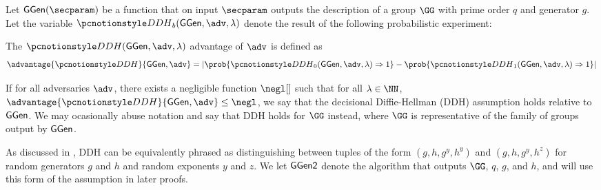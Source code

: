 Let $\groupgen(\secparam)$ be a function that on input $\secparam$ outputs the description of a group $\GG$ with prime order $q$ and generator $g$.
Let the variable $\ddh_b(\groupgen, \adv, \secpar)$ denote the result of the following probabilistic experiment:


The $\ddh(\groupgen, \adv, \secpar)$ advantage of $\adv$ is defined as
$$
	\advantage{\ddh}{\groupgen, \adv} = \left|\prob{\ddh_0(\groupgen, \adv, \secpar) \Rightarrow 1} - \prob{\ddh_1(\groupgen, \adv, \secpar) \Rightarrow 1}\right|
$$

If for all adversaries $\adv$, there exists a negligible function $\negl[]$ such that for all $\secpar \in \NN$, $\advantage{\ddh}{\groupgen, \adv} \allowbreak\leq\allowbreak \negl$, we say that the decisional Diffie-Hellman (DDH) assumption holds relative to $\mathsf{GGen}$.
We may ocasionally abuse notation and say that DDH holds for $\GG$ instead, where $\GG$ is representative of the family of groups output by $\mathsf{GGen}$.

As discussed in \cite{C:PeiVaiWat08}, DDH can be equivalently phrased as distinguishing between tuples of the form $(g, h, g^y, h^y)$ and $(g, h, g^y, h^z)$ for random generators $g$ and $h$ and random exponents $y$ and $z$.
We let $\mathsf{GGen2}$ denote the algorithm that outputs $\GG$, $q$, $g$, and $h$, and will use this form of the assumption in later proofs.
